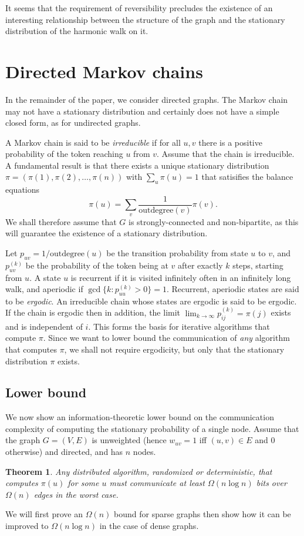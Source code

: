 \documentclass[twocolumn]{article}
\newtheorem{theorem}{Theorem}
\begin{document}
It seems that the requirement of reversibility precludes the existence of an interesting relationship between the structure of the graph and the stationary distribution of the harmonic walk on it.

\section{Directed Markov chains}
\label{section:general_unweighted}
In the remainder of the paper, we consider directed graphs. The Markov chain may not have a stationary distribution and certainly does not have a simple closed form, as for undirected graphs.

A Markov chain is said to be {\em irreducible} if for all $u,v$ there is a positive probability of the token reaching $u$ from $v$. Assume that the chain is irreducible. A fundamental result is that there exists a unique stationary distribution $\pi = (\pi(1),\pi(2),\ldots,\pi(n))$ with $\sum_u \pi(u) = 1$ that satisifies the balance equations $$\pi(u) = \sum_v \frac{1}{\mbox{outdegree}(v)} \pi(v).$$ We shall therefore assume that $G$ is strongly-connected and non-bipartite, as this will guarantee the existence of a stationary distribution.

Let $p_{uv}=1/{\mbox{outdegree}(u)}$ be the transition probability from state $u$ to $v$, and $p_{uv}^{(k)}$ be the probability of the token being at $v$ after exactly $k$ steps, starting from $u$. A state $u$ is recurrent if it is visited infinitely often in an infinitely long walk, and aperiodic if $\gcd \{ k : p_{uu}^{(k)} > 0 \} = 1$. Recurrent, aperiodic states are said to be {\em ergodic}. An irreducible chain whose states are ergodic is said to be ergodic. If the chain is ergodic then in addition, the limit $\lim_{k \to \infty} p_{ij}^{(k)} = \pi(j)$ exists and is independent of $i$. This forms the basis for iterative algorithms that compute $\pi$. Since we want to lower bound the communication of {\em any} algorithm that computes $\pi$, we shall not require ergodicity, but only that the stationary distribution $\pi$ exists.

\subsection{Lower bound}
We now show an information-theoretic lower bound on the communication complexity of computing the stationary probability of a single node. Assume that the graph $G=(V,E)$ is unweighted (hence $w_{uv}=1$ iff $(u,v) \in E$ and $0$ otherwise) and directed, and has $n$ nodes.
\begin{theorem}
Any distributed algorithm, randomized or deterministic, that computes $\pi(u)$
for some $u$ must communicate at least $\Omega(n \log n)$ bits over $\Omega(n)$
edges in the worst case.
\label{thm:main}
\end{theorem}
We will first prove an $\Omega(n)$ bound for sparse graphs then show
how it can be improved to $\Omega(n \log n)$ in the case of dense graphs.
\end{document}
